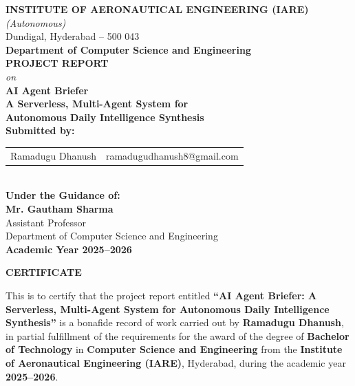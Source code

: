 \documentclass[12pt,a4paper]{report}
\begin{document}
\begin{titlepage}
\begin{center}
\vspace*{0.5cm}
\textbf{\Large INSTITUTE OF AERONAUTICAL ENGINEERING (IARE)}\\[0.3cm]
\textit{(Autonomous)}\\
Dundigal, Hyderabad -- 500 043\\[1cm]

\textbf{\large Department of Computer Science and Engineering}\\[2cm]

\textbf{\LARGE PROJECT REPORT}\\[0.5cm]
\textit{on}\\[0.5cm]

\textbf{\huge AI Agent Briefer}\\[0.3cm]
\textbf{\Large A Serverless, Multi-Agent System for\\Autonomous Daily Intelligence Synthesis}\\[2cm]

\textbf{Submitted by:}\\[0.3cm]
\begin{tabular}{ll}
Ramadugu Dhanush & ramadugudhanush8@gmail.com \\
\end{tabular}\\[1.5cm]

\textbf{Under the Guidance of:}\\[0.3cm]
\textbf{Mr. Gautham Sharma}\\
Assistant Professor\\
Department of Computer Science and Engineering\\[1.5cm]

\textbf{Academic Year 2025--2026}
\end{center}
\end{titlepage}

\newpage
\thispagestyle{empty}
\begin{center}
\textbf{\Large CERTIFICATE}\\[1.5cm]
\end{center}

This is to certify that the project report entitled \textbf{``AI Agent Briefer: A Serverless, Multi-Agent System for Autonomous Daily Intelligence Synthesis''} is a bonafide record of work carried out by \textbf{Ramadugu Dhanush}, in partial fulfillment of the requirements for the award of the degree of \textbf{Bachelor of Technology} in \textbf{Computer Science and Engineering} from the \textbf{Institute of Aeronautical Engineering (IARE)}, Hyderabad, during the academic year \textbf{2025--2026}.\\[3cm]
\end{document}
